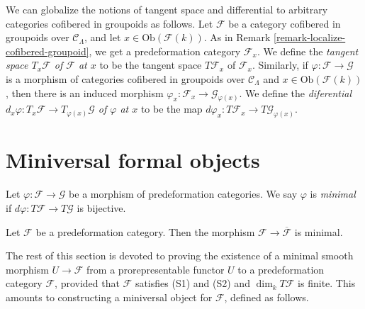 \begin{remark}
\label{remark-tangent-space-cofibered-groupoid}
We can globalize the notions of tangent space and differential to arbitrary 
categories cofibered in groupoids as follows. Let $\mathcal{F}$ be a category 
cofibered in groupoids over $\mathcal{C}_\Lambda$, and let $x \in 
\text{Ob}(\mathcal{F}(k))$.  As in Remark 
\ref{remark-localize-cofibered-groupoid}, we get a predeformation category 
$\mathcal{F}_x$.  We define the {\it tangent space $T_x \mathcal{F}$ of 
$\mathcal{F}$ at $x$} to be the tangent space $T \mathcal{F}_x$ of $\mathcal 
F_x$.  Similarly, if $\varphi: \mathcal{F} \to \mathcal{G}$ is a morphism 
of categories cofibered in groupoids over $\mathcal{C}_\Lambda$ and $x \in 
\text{Ob}(\mathcal{F}(k))$, then there is an induced morphism $\varphi_x: 
\mathcal{F}_x \to \mathcal{G}_{\varphi(x)}$.  We define the 
{\it diferential $d_{x} \varphi: T_{x} \mathcal{F} \to T_{\varphi(x)} 
\mathcal{G}$ of $\varphi$ at $x$} to be the map $d \varphi_x: T \mathcal{F}_x 
\to T \mathcal{G}_{\varphi(x)}$.
\end{remark}



\section{Miniversal formal objects}
\label{section-miniversal-objects-existence}



\begin{definition}
\label{definition-minimal-morphism}
Let $\varphi: \mathcal{F} \to \mathcal{G}$ be a morphism of 
predeformation categories.  We say $\varphi$ is {\it minimal} if $d \varphi: 
 T \mathcal{F} \to T \mathcal{G}$ is bijective.
\end{definition}

\begin{remark}
\label{remark-predeformation-category-minimal-over-iso}
Let $\mathcal{F}$ be a predeformation category.  Then the morphism $\mathcal{F} 
\to \overline{\mathcal{F}}$ is minimal.
\end{remark}

\noindent
The rest of this section is devoted to proving the existence of a minimal 
smooth morphism $U \to \mathcal{F}$ from a prorepresentable functor $U$ 
to a predeformation category $\mathcal{F}$, provided that $\mathcal{F}$ satisfies 
(S1) and (S2) and $\dim_{k} T\mathcal{F}$ is finite.  This amounts to 
constructing a miniversal object for $\mathcal{F}$, defined as follows.

